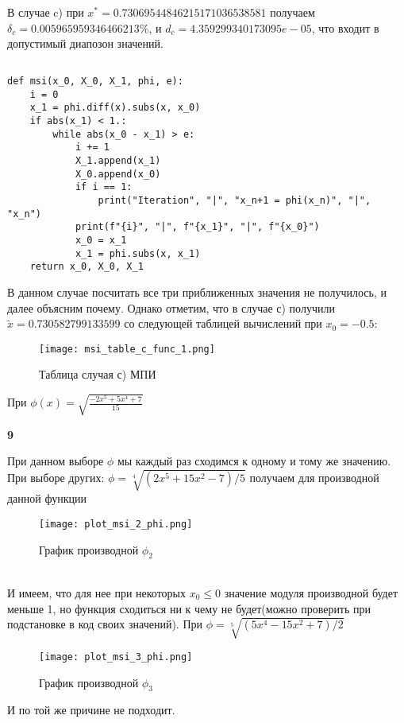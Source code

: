 \documentclass[a4paper,12pt]{article}
\begin{document}
В случае c) при $x^* = 0.73069544846215171036538581$ получаем $\delta_c = 0.005965959346466213 \%$, и $d_c = 4.359299340173095e-05$, что входит в допустимый диапозон значений.



\subsection{}
\begin{lstlisting}
def msi(x_0, X_0, X_1, phi, e):
    i = 0
    x_1 = phi.diff(x).subs(x, x_0)
    if abs(x_1) < 1.:
        while abs(x_0 - x_1) > e:
            i += 1
            X_1.append(x_1)
            X_0.append(x_0)
            if i == 1:
                print("Iteration", "|", "x_n+1 = phi(x_n)", "|", "x_n")
            print(f"{i}", "|", f"{x_1}", "|", f"{x_0}")
            x_0 = x_1
            x_1 = phi.subs(x, x_1)
    return x_0, X_0, X_1
\end{lstlisting}
В данном случае посчитать все три приближенных значения не получилось, и далее объясним почему.
Однако отметим, что в случае с) получили $\tilde{x} = 0.730582799133599$ со следующей таблицей вычислений при $x_0 = -0.5$:
\begin{figure}[h]
    \centering
    \texttt{[image: msi\_table\_c\_func\_1.png]}
    \caption{Таблица случая с) МПИ}
    \label{msi_a_graph}
\end{figure}
При $\phi(x) = \sqrt{\frac{-2x^5 + 5x^4 + 7}{15}}$
\newpage

\begin{center}
{\bf9}\\
\vspace{0.5cm}
\end{center}
\setcounter{page}{9}
При данном выборе $\phi$ мы каждый раз сходимся к одному и тому же значению.
При выборе других: $\phi = \sqrt[4]{(2x^5 + 15x^2 -7)/5}$ получаем для производной данной функции
\begin{figure}[h]
    \centering
    \texttt{[image: plot\_msi\_2\_phi.png]}
    \caption{График производной $\phi_2$}
\end{figure}\\
И имеем, что для нее при некоторых $x_0 \le 0$ значение модуля производной будет меньше 1, но функция сходиться ни к чему не будет(можно проверить при подстановке в код своих значений).
При $\phi = \sqrt[5]{(5x^4 - 15x^2 + 7)/2}$
\begin{figure}[h]
    \centering
    \texttt{[image: plot\_msi\_3\_phi.png]}
    \caption{График производной $\phi_3$}
\end{figure}
И по той же причине не подходит.
\newpage
\end{document}
